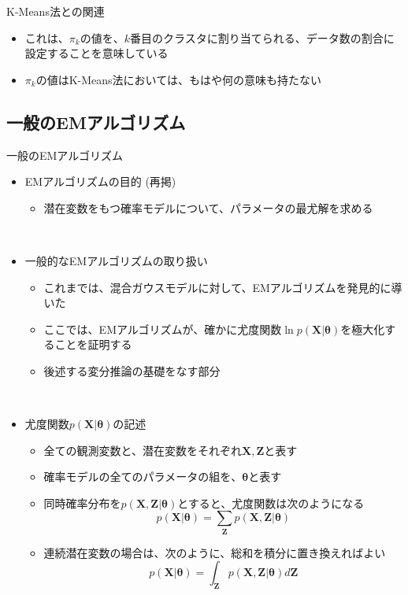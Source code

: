 \documentclass[dvipdfmx,notheorems,t]{beamer}
\begin{document}
\begin{frame}{K-Means法との関連}
\begin{itemize}
\begin{itemize}
		\item これは、$\pi_k$の値を、$k$番目のクラスタに割り当てられる、データ数の割合に設定することを意味している
		\item $\pi_k$の値はK-Means法においては、もはや何の意味も持たない
	\end{itemize}
\end{itemize}

\end{frame}

\subsection{一般のEMアルゴリズム}

\begin{frame}{一般のEMアルゴリズム}

\begin{itemize}
	\item EMアルゴリズムの目的 (再掲)
	\begin{itemize}
		\item 潜在変数をもつ確率モデルについて、パラメータの最尤解を求める
	\end{itemize} \
	
	\item 一般的なEMアルゴリズムの取り扱い
	\begin{itemize}
		\item これまでは、混合ガウスモデルに対して、EMアルゴリズムを発見的に導いた
		\item ここでは、EMアルゴリズムが、確かに尤度関数$\ln p(\bm{X} | \bm{\theta})$を\alert{極大化}することを証明する
		\item 後述する\alert{変分推論}の基礎をなす部分
	\end{itemize} \
	
	\item 尤度関数$p(\bm{X} | \bm{\theta})$の記述
	\begin{itemize}
		\item 全ての観測変数と、潜在変数をそれぞれ$\bm{X}, \bm{Z}$と表す
		\item 確率モデルの全てのパラメータの組を、$\bm{\theta}$と表す
		\item 同時確率分布を$p(\bm{X}, \bm{Z} | \bm{\theta})$とすると、尤度関数は次のようになる
		\begin{equation}
			p(\bm{X} | \bm{\theta}) = \sum_{\bm{Z}} p(\bm{X}, \bm{Z} | \bm{\theta})
		\end{equation}
		
		\item 連続潜在変数の場合は、次のように、総和を積分に置き換えればよい
		\begin{equation}
			p(\bm{X} | \bm{\theta}) = \int_{\bm{Z}} p(\bm{X}, \bm{Z} | \bm{\theta}) d\bm{Z}
		\end{equation}
		

\end{itemize}
\end{itemize}
\end{frame}
\end{document}
